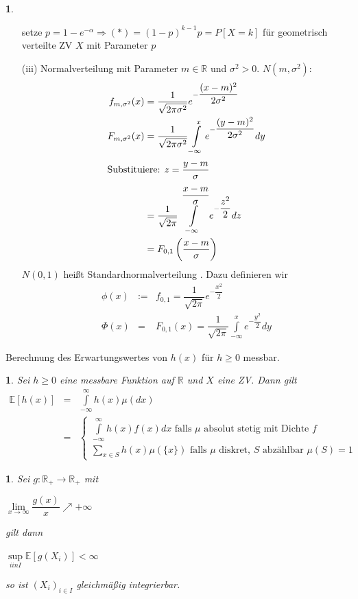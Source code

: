 \documentclass[10pt,a4paper]{report}
\newcommand{\E}{\mathbb{E}}
\newcommand{\R}{\mathbb{R}}
\numberwithin{equation}{section}
\numberwithin{figure}{section}
\theoremstyle{plain}
\theoremstyle{definition}
\newtheorem{example}[thm]{\protect\examplename}
\theoremstyle{remark}
\theoremstyle{plain}
\newtheorem{prop}[thm]{\protect\propositionname}
\providecommand{\examplename}{Beispiel}
\providecommand{\propositionname}{Satz}
\newcommand{\1}{ \mathbb{1} } %
\begin{document}
\begin{example}
\begin{itemize}
    setze $p=1-e^{-\alpha} \Rightarrow (*)=(1-p)^{k-1}p=P[X=k]$ für
    geometrisch verteilte ZV $X$ mit Parameter $p$
  \item[(iii)] Normalverteilung mit Parameter $m \in \R$ und
    $\sigma^2>0$. $N(m,\sigma^2)$:
    \begin{align*}
      f_{m,\sigma^2}(x)&=\dfrac{1}{\sqrt{2\pi \sigma^2}} e^{-\dfrac{(x-m)^2}{2\sigma^2}}\\
      F_{m,\sigma^2}(x)&=\dfrac{1}{\sqrt{2\pi \sigma^2}} \int\limits_{-\infty}^xe^{-\dfrac{(y-m)^2}{2\sigma^2}}dy\\
      \intertext{Substituiere: $z=\dfrac{y-m}{\sigma}$}
      &=\dfrac{1}{\sqrt{2\pi}} \int\limits_{-\infty}^{\dfrac{x-m}{\sigma}}e^{-\dfrac{z^2}{2}}dz\\
      &=F_{0,1}\left(\dfrac{x-m}{\sigma}\right)
    \end{align*}
    $N(0,1)$ heißt Standardnormalverteilung . Dazu definieren wir
    \begin{eqnarray*}
      \phi(x)&:=& f_{0,1}=\dfrac{1}{\sqrt{2\pi}}e^{-\dfrac{x^2}{2}}\\
      \Phi(x)&=& F_{0,1}(x)=\dfrac{1}{\sqrt{2\pi}}\int\limits_{-\infty}^x e^{-\dfrac{y^2}{2}}dy
    \end{eqnarray*}
  \end{itemize}
\end{example}
Berechnung des Erwartungswertes von $h(x)$ für $h \geq 0$ messbar.
\begin{prop}
  Sei $h\geq 0$ eine messbare Funktion auf $\R$ und $X$ eine ZV. Dann
  gilt
  \begin{eqnarray*}
    \E[h(x)] &=& \int\limits_{-\infty}^{\infty} h(x) \mu(dx)\\
    &=& \begin{cases}
      \int\limits_{-\infty}^\infty h(x)f(x) dx \text{ falls } \mu \text{ absolut stetig mit Dichte } f\\
      \sum\limits_{x \in S} h(x)\mu(\{x\}) \text{ falls } \mu \text{ diskret, } S \text{ abzählbar } \mu(S)=1
    \end{cases}
  \end{eqnarray*}
\end{prop}
\begin{prop}
  Sei $g:\R_+ \to \R_+$ mit
  \begin{center}
    $\lim\limits_{x\to \infty} \dfrac{g(x)}{x}\nearrow +\infty$
  \end{center}
  gilt dann
  \begin{center}
    $\sup\limits_{i in I} \E[g(X_i)]<\infty$
  \end{center}
  so ist $(X_i)_{i \in I}$ gleichmäßig integrierbar.
\end{prop}
\end{document}
